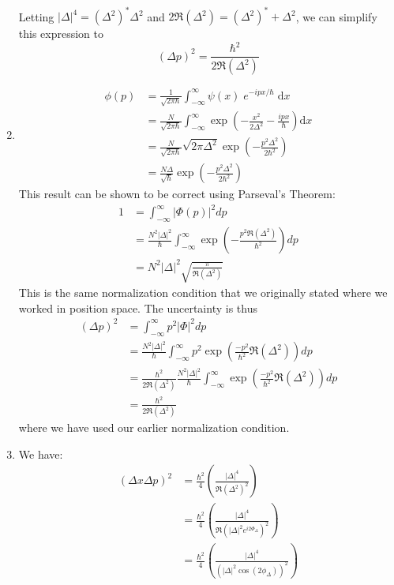 \begin{sol}
\begin{enumerate}[label=\textbf{(\alph*)}]
\begin{align*}
\end{align*}
Letting $|\Delta|^4=(\Delta^2)^*\Delta^2$ and $2\Re(\Delta^2)=(\Delta^2)^*+\Delta^2$, we can simplify this expression to
$$(\Delta p)^2 = \frac{\hbar^2}{2\Re(\Delta^2)}$$
\item \begin{align*}
\phi(p) &= \frac{1}{\sqrt{2\pi\hbar}}\int_{-\infty}^{\infty}\psi(x)\;e^{-ipx/\hbar}\;\mathrm{d}x \\ &= \frac{N}{\sqrt{2\pi\hbar}}\int_{-\infty}^{\infty}\operatorname{exp}\left(-\frac{x^2}{2\Delta^2} - \frac{ipx}{\hbar}\right)\mathrm{d}x \\ &= \frac{N}{\sqrt{2\pi\hbar}}\sqrt{2\pi\Delta^2}\operatorname{exp}\left(-\frac{p^2\Delta^2}{2\hbar^2}\right) \\ &= \frac{N\Delta}{\sqrt{\hbar}}\operatorname{exp}\left(-\frac{p^2\Delta^2}{2\hbar^2}\right)
\end{align*}
This result can be shown to be correct using Parseval's Theorem:
\begin{align*}
    1 &= \int_{-\infty}^{\infty} |\Phi(p)|^2 dp \\
    &= \frac{N^2|\Delta|^2}{\hbar}\int_{-\infty}^{\infty} \exp\left(-\frac{p^2\Re(\Delta^2)}{\hbar^2}\right)dp\\
    &= N^2|\Delta|^2\sqrt{\frac{\pi}{\Re(\Delta^2)}}
\end{align*}
This is the same normalization condition that we originally stated where we worked in position space. The uncertainty is thus
\begin{align*}
    (\Delta p)^2 &= \int_{-\infty}^{\infty} p^2|\Phi|^2 dp \\
    &= \frac{N^2|\Delta|^2}{\hbar}\int_{-\infty}^{\infty}p^2\exp\left(\frac{-p^2}{\hbar^2}\Re(\Delta^2)\right) dp \\
    &= \frac{\hbar^2}{2\Re(\Delta^2)}\frac{N^2|\Delta|^2}{\hbar}\int_{-\infty}^{\infty}\exp\left(\frac{-p^2}{\hbar^2}\Re(\Delta^2)\right) dp \\
    &= \frac{\hbar^2}{2\Re(\Delta^2)}
\end{align*}
where we have used our earlier normalization condition.
\item We have:
\begin{align*}
    (\Delta x\Delta p)^2 &= \frac{\hbar^2}{4}\left(\frac{|\Delta|^4}{\Re(\Delta^2)^2}\right) \\
    &= \frac{\hbar^2}{4}\left(\frac{|\Delta|^4}{\Re(|\Delta|^2e^{i2\Phi_\Delta})^2}\right) \\
    &= \frac{\hbar^2}{4}\left(\frac{|\Delta|^4}{(|\Delta|^2\cos(2\phi_\Delta))^2}\right) \\

\end{align*}
\end{enumerate}
\end{sol}
